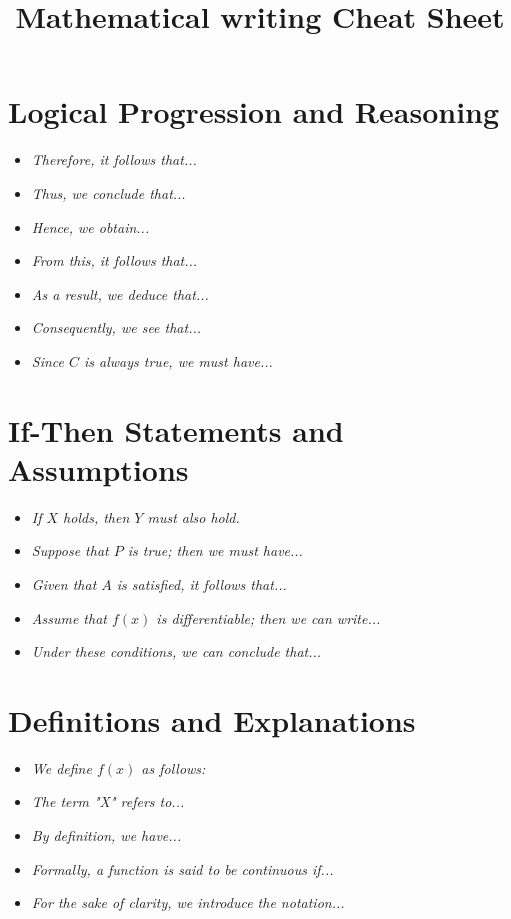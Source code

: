 \documentclass[10pt,letterpaper,oneside,reqno]{amsart}
\title[Mathematical writing Cheat Sheet]
{Mathematical writing Cheat Sheet}
\begin{document}
    \maketitle

    \begin{multicols}{2}

        \section*{Logical Progression and Reasoning}
        \begin{itemize}
            \item \textit{Therefore, it follows that...}
            \item \textit{Thus, we conclude that...}
            \item \textit{Hence, we obtain...}
            \item \textit{From this, it follows that...}
            \item \textit{As a result, we deduce that...}
            \item \textit{Consequently, we see that...}
            \item \textit{Since $C$ is always true, we must have...}
        \end{itemize}

        \section*{If-Then Statements and Assumptions}
        \begin{itemize}
            \item \textit{If \( X \) holds, then \( Y \) must also hold.}
            \item \textit{Suppose that \( P \) is true; then we must have...}
            \item \textit{Given that \( A \) is satisfied, it follows that...}
            \item \textit{Assume that \( f(x) \) is differentiable; then we can write...}
            \item \textit{Under these conditions, we can conclude that...}
        \end{itemize}

        \section*{Definitions and Explanations}
        \begin{itemize}
            \item \textit{We define \( f(x) \) as follows:}
            \item \textit{The term "X" refers to...}
            \item \textit{By definition, we have...}
            \item \textit{Formally, a function is said to be continuous if...}
            \item \textit{For the sake of clarity, we introduce the notation...}
        \end{itemize}


\end{multicols}
\end{document}
